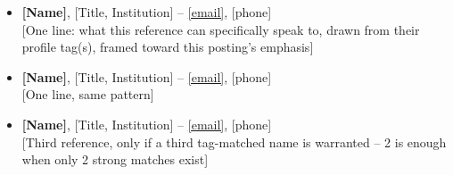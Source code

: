 \documentclass[]{cover}
\begin{document}


\currentdate{\today}

{\raggedright{}\fontsize{11pt}{14pt}\selectfont
\begin{itemize}
    \item \textbf{[Name]}, [Title, Institution] -- \href{mailto:[email]}{[email]}, [phone] \\{}
    [One line: what this reference can specifically speak to, drawn from their profile tag(s), framed toward this posting's emphasis]
    \item \textbf{[Name]}, [Title, Institution] -- \href{mailto:[email]}{[email]}, [phone] \\{}
    [One line, same pattern]
    \item \textbf{[Name]}, [Title, Institution] -- \href{mailto:[email]}{[email]}, [phone] \\{}
    [Third reference, only if a third tag-matched name is warranted -- 2 is enough when only 2 strong matches exist]
\end{itemize}\par}
\end{document}
